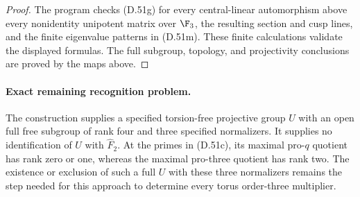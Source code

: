 \begin{proof}
The program
checks (D.51g) for every central-linear
automorphism above every nonidentity unipotent
matrix over $\F_3$, the resulting section and
cusp lines, and the finite eigenvalue patterns
in (D.51m). These finite calculations validate
the displayed formulas. The full subgroup,
topology, and projectivity conclusions are
proved by the maps above.
\end{proof}

\paragraph{Exact remaining recognition problem.}
The construction supplies a specified torsion-free
projective group $U$ with an open full free subgroup
of rank four and three specified normalizers.
It supplies no identification of $U$ with
$\widehat F_2$.
At the primes in (D.51c), its maximal pro-$q$
quotient has rank zero or one, whereas the
maximal pro-three quotient has rank two.
The existence or exclusion of such a full
$U$ with these three normalizers remains the
step needed for this approach to determine
every torus order-three multiplier.
